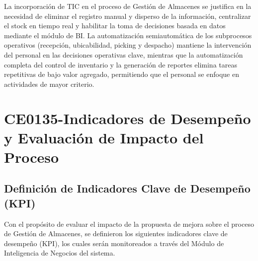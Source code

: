 \documentclass[11pt, a4paper, oneside]{report}
\begin{document}
La incorporación de TIC en el proceso de Gestión de Almacenes se justifica en la necesidad de eliminar el registro manual y disperso de la información, centralizar el stock en tiempo real y habilitar la toma de decisiones basada en datos mediante el módulo de BI. La automatización semiautomática de los subprocesos operativos (recepción, ubicabilidad, picking y despacho) mantiene la intervención del personal en las decisiones operativas clave, mientras que la automatización completa del control de inventario y la generación de reportes elimina tareas repetitivas de bajo valor agregado, permitiendo que el personal se enfoque en actividades de mayor criterio.


\chapter{CE0135-Indicadores de Desempeño y Evaluación de Impacto del Proceso}

\section{Definición de Indicadores Clave de Desempeño (KPI)}

Con el propósito de evaluar el impacto de la propuesta de mejora sobre el proceso de Gestión de Almacenes, se definieron los siguientes indicadores clave de desempeño (KPI), los cuales serán monitoreados a través del Módulo de Inteligencia de Negocios del sistema.
\end{document}
